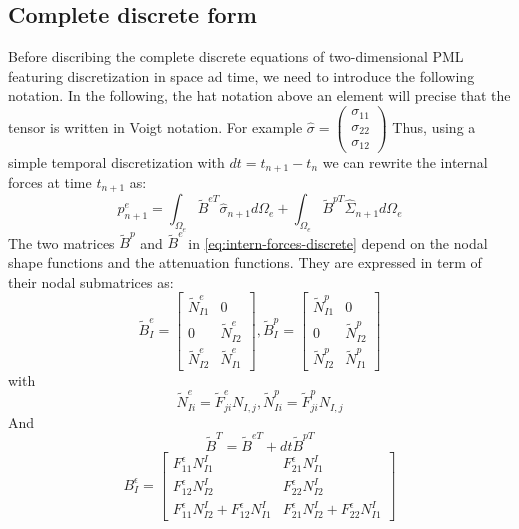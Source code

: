 \subsection{Complete discrete form}
Before discribing the complete discrete equations of two-dimensional PML featuring discretization in space ad time, we need to introduce the following notation. In the following, the hat notation above an element will precise that the tensor is written in Voigt notation. For example $\hat{\sigma} = \begin{pmatrix}
\sigma_{11} \\
\sigma_{22} \\
\sigma_{12}
\end{pmatrix}$ 
Thus, using a simple temporal discretization with $dt=t_{n+1} - t_n$ we can rewrite the internal forces at time $t_{n+1}$ as:
\begin{equation}
p_{n+1}^e = \int_{\Omega_e} \tilde{B}^{eT} \hat{\sigma}_{n+1} d\Omega_e + \int_{\Omega_e}\tilde{B}^{pT} \hat{\Sigma}_{n+1} d\Omega_e
\label{eq:intern-forces-discrete}
\end{equation} 
The two matrices $\tilde{B}^{p}$ and $\tilde{B}^{e}$ in \ref{eq:intern-forces-discrete} depend on the nodal shape functions and the attenuation functions. They are expressed in term of their nodal submatrices as:
\begin{equation}
\tilde{B}^e_I = \begin{bmatrix}
\tilde{N}^e_{I1}&0\\0&\tilde{N}^e_{I2}\\\tilde{N}^e_{I2}&\tilde{N}^e_{I1}
\end{bmatrix}, \tilde{B}^p_I = \begin{bmatrix}
\tilde{N}^p_{I1}&0\\0&\tilde{N}^p_{I2}\\\tilde{N}^p_{I2}&\tilde{N}^p_{I1}
\end{bmatrix}
\end{equation} 
with 
\begin{equation}
\tilde{N}^e_{Ii} = \tilde{F}^e_{ji}N_{I,j}, \tilde{N}^p_{Ii} = \tilde{F}^p_{ji}N_{I,j}
\end{equation}
And
\begin{equation}
\tilde{B}^T = \tilde{B}^{eT}+dt \tilde{B}^{pT}
\end{equation}
\begin{equation}
B^\epsilon_I = \begin{bmatrix}
F^\epsilon_{11}N^I_{I1}&F^\epsilon_{21}N^I_{I1}\\
F^\epsilon_{12}N^I_{I2}&F^\epsilon_{22}N^I_{I2}\\
F^\epsilon_{11}N^I_{I2}+F^\epsilon_{12}N^I_{I1}& F^\epsilon_{21}N^I_{I2}+F^\epsilon_{22}N^I_{I1}
\end{bmatrix}
\end{equation}

